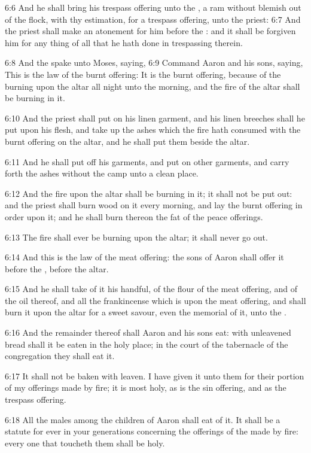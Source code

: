 6:6 And he shall bring his trespass offering unto the \LORD, a ram without blemish out of the flock, with thy estimation, for a trespass offering, unto the priest: 6:7 And the priest shall make an atonement for him before the \LORD: and it shall be forgiven him for any thing of all that he hath done in trespassing therein.

6:8 And the \LORD spake unto Moses, saying, 6:9 Command Aaron and his sons, saying, This is the law of the burnt offering: It is the burnt offering, because of the burning upon the altar all night unto the morning, and the fire of the altar shall be burning in it.

6:10 And the priest shall put on his linen garment, and his linen breeches shall he put upon his flesh, and take up the ashes which the fire hath consumed with the burnt offering on the altar, and he shall put them beside the altar.

6:11 And he shall put off his garments, and put on other garments, and carry forth the ashes without the camp unto a clean place.

6:12 And the fire upon the altar shall be burning in it; it shall not be put out: and the priest shall burn wood on it every morning, and lay the burnt offering in order upon it; and he shall burn thereon the fat of the peace offerings.

6:13 The fire shall ever be burning upon the altar; it shall never go out.

6:14 And this is the law of the meat offering: the sons of Aaron shall offer it before the \LORD, before the altar.

6:15 And he shall take of it his handful, of the flour of the meat offering, and of the oil thereof, and all the frankincense which is upon the meat offering, and shall burn it upon the altar for a sweet savour, even the memorial of it, unto the \LORD.

6:16 And the remainder thereof shall Aaron and his sons eat: with unleavened bread shall it be eaten in the holy place; in the court of the tabernacle of the congregation they shall eat it.

6:17 It shall not be baken with leaven. I have given it unto them for their portion of my offerings made by fire; it is most holy, as is the sin offering, and as the trespass offering.

6:18 All the males among the children of Aaron shall eat of it. It shall be a statute for ever in your generations concerning the offerings of the \LORD made by fire: every one that toucheth them shall be holy.

